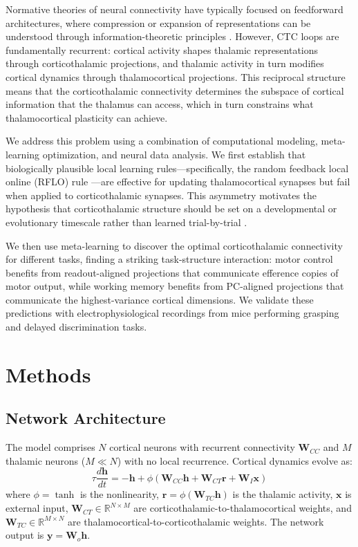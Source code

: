 \documentclass[11pt]{article}
\begin{document}
Normative theories of neural connectivity have typically focused on feedforward architectures, where compression or expansion of representations can be understood through information-theoretic principles \citep{mastrogiuseppe2018linking}. However, CTC loops are fundamentally recurrent: cortical activity shapes thalamic representations through corticothalamic projections, and thalamic activity in turn modifies cortical dynamics through thalamocortical projections. This reciprocal structure means that the corticothalamic connectivity determines the subspace of cortical information that the thalamus can access, which in turn constrains what thalamocortical plasticity can achieve.

We address this problem using a combination of computational modeling, meta-learning optimization, and neural data analysis. We first establish that biologically plausible local learning rules---specifically, the random feedback local online (RFLO) rule \citep{lillicrap2016rflo}---are effective for updating thalamocortical synapses but fail when applied to corticothalamic synapses. This asymmetry motivates the hypothesis that corticothalamic structure should be set on a developmental or evolutionary timescale rather than learned trial-by-trial \citep{finn2021learning}.

We then use meta-learning to discover the optimal corticothalamic connectivity for different tasks, finding a striking task-structure interaction: motor control benefits from readout-aligned projections that communicate efference copies of motor output, while working memory benefits from PC-aligned projections that communicate the highest-variance cortical dimensions. We validate these predictions with electrophysiological recordings from mice performing grasping and delayed discrimination tasks.

\section{Methods}

\subsection{Network Architecture}

The model comprises $N$ cortical neurons with recurrent connectivity $\mathbf{W}_{CC}$ and $M$ thalamic neurons ($M \ll N$) with no local recurrence. Cortical dynamics evolve as:
\begin{equation}
\tau \frac{d\mathbf{h}}{dt} = -\mathbf{h} + \phi(\mathbf{W}_{CC}\mathbf{h} + \mathbf{W}_{CT}\mathbf{r} + \mathbf{W}_I\mathbf{x})
\end{equation}
where $\phi = \tanh$ is the nonlinearity, $\mathbf{r} = \phi(\mathbf{W}_{TC}\mathbf{h})$ is the thalamic activity, $\mathbf{x}$ is external input, $\mathbf{W}_{CT} \in \mathbb{R}^{N \times M}$ are corticothalamic-to-thalamocortical weights, and $\mathbf{W}_{TC} \in \mathbb{R}^{M \times N}$ are thalamocortical-to-corticothalamic weights. The network output is $\mathbf{y} = \mathbf{W}_o \mathbf{h}$.
\end{document}
